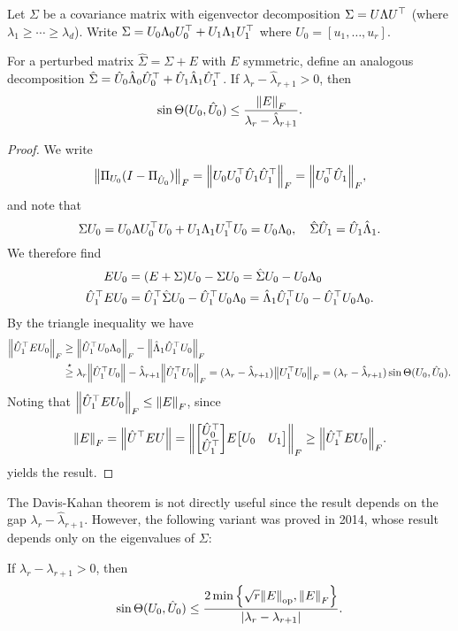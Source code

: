 \begin{theorem}
	Let $\Sigma$ be a covariance matrix with eigenvector decomposition $\Sigma = U\Lambda U^\top$ (where $\lambda_1 \geq \dotsb \geq \lambda_d$). Write $\Sigma = U_0 \Lambda_0 U_0^\top + U_1 \Lambda_1 U_1^\top$ where $U_0 = [u_1, \dotsc, u_r]$. 
	
	For a perturbed matrix $\hat\Sigma = \Sigma + E$ with $E$ symmetric, define an analogous decomposition $\hat\Sigma = \hat U_0 \hat\Lambda_0 \hat U_0^\top + \hat U_1 \hat\Lambda_1 \hat U_1^\top$. If $\lambda_r - \hat\lambda_{r+1} > 0$, then
	\[
	\sin\Theta (U_0, \hat U_0)  \leq \frac{\norm{E}_F}{\lambda_r - \hat\lambda_{r+1}}. 
	\]
\end{theorem}

\begin{proof}
	We write
	\[
	\norm{\Pi_{U_0}(I - \Pi_{\hat U_0})}_F = \norm{U_0 U_0^\top \hat U_1 \hat U_1^\top}_F = \norm{U_0^\top \hat U_1}_F, 
	\]
	and note that 
	\[
	\Sigma U_0 = U_0\Lambda U_0^\top U_0 + U_1 \Lambda_1 U_1^\top U_0 =  U_0\Lambda_0, \quad \hat\Sigma \hat U_1 = \hat U_1 \hat\Lambda_1. 
	\]
	We therefore find 
	\begin{align*}
	E U_0 &= (E + \Sigma) U_0 - \Sigma U_0 = \hat\Sigma U_0 - U_0 \Lambda_0 \\
	\hat U_1^\top EU_0 &= \hat U_1^\top \hat\Sigma U_0 - \hat U_1^\top U_0 \Lambda_0 = \hat\Lambda_1 \hat U_1^\top U_0 - \hat U_1^\top U_0 \Lambda_0. 
	\end{align*}
By the triangle inequality we have
\begin{align*}
\norm{\hat U_1^\top E U_0}_F &\geq \norm{\hat U_1^\top U_0 \Lambda_0}_F - \norm{\hat\Lambda_1 \hat U_1^\top U_0}_F \\
&\overset\star\geq \lambda_r \norm{\hat U_1^\top U_0} - \hat\lambda_{r+1} \norm{\hat U_1^\top U_0}_F = (\lambda_r - \hat\lambda_{r+1}) \norm{U_1^\top U_0}_F = (\lambda_r - \hat\lambda_{r+1}) \sin\Theta(U_0, \hat U_0). 
\end{align*}
Noting that $\norm{\hat U_1^\top E U_0}_F \leq \norm{E}_F$,
since
\[
\norm{E}_F = \norm{\hat U\T E U} = \norm{\mqty[\hat U_0\T \\ \hat U_1\T ] E \mqty[U_0 & U_1]}_F \geq \norm{\hat U_1\T E U_0}_F. 
\] yields the result. 
\end{proof}

The Davis-Kahan theorem is not directly useful since the result depends on the gap $\lambda_r - \hat\lambda_{r+1}$. However, the following variant was proved in 2014, whose result depends only on the eigenvalues of $\Sigma$:
\begin{theorem}
	If $\lambda_r - \lambda_{r+1} > 0$, then
	\[
	\sin\Theta (U_0, \hat U_0) \leq \frac{2\min \qty{\sqrt r \norm{E}_\mathrm{op}, \norm{E}_F}}{\abs{\lambda_r - \lambda_{r+1}}}. 
	\]
\end{theorem}

